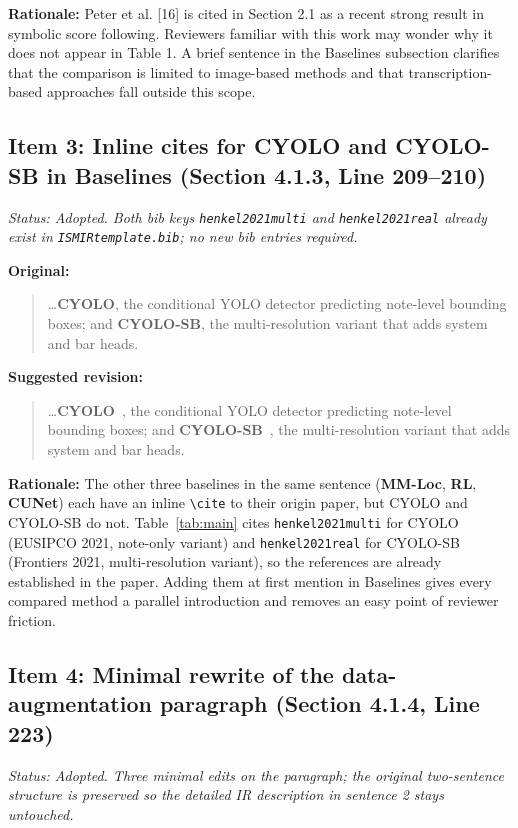 \documentclass{article}
\begin{document}
\textbf{Rationale:}
Peter et al. [16] is cited in Section 2.1 as a recent strong result in symbolic score following. Reviewers familiar with this work may wonder why it does not appear in Table 1. A brief sentence in the Baselines subsection clarifies that the comparison is limited to image-based methods and that transcription-based approaches fall outside this scope.

\subsection*{Item 3: Inline cites for CYOLO and CYOLO-SB in Baselines (Section 4.1.3, Line 209--210)}

\textit{Status: Adopted. Both bib keys \texttt{henkel2021multi} and \texttt{henkel2021real} already exist in \texttt{ISMIRtemplate.bib}; no new bib entries required.}

\textbf{Original:}
\begin{quote}
\ldots \textbf{CYOLO}, the conditional YOLO detector predicting note-level bounding boxes; and \textbf{CYOLO-SB}, the multi-resolution variant that adds system and bar heads.
\end{quote}

\textbf{Suggested revision:}
\begin{quote}
\ldots \textbf{CYOLO}~\cite{henkel2021multi}, the conditional YOLO detector predicting note-level bounding boxes; and \textbf{CYOLO-SB}~\cite{henkel2021real}, the multi-resolution variant that adds system and bar heads.
\end{quote}

\textbf{Rationale:}
The other three baselines in the same sentence (\textbf{MM-Loc}, \textbf{RL}, \textbf{CUNet}) each have an inline \texttt{\textbackslash cite} to their origin paper, but CYOLO and CYOLO-SB do not. Table~\ref{tab:main} cites \texttt{henkel2021multi} for CYOLO (EUSIPCO 2021, note-only variant) and \texttt{henkel2021real} for CYOLO-SB (Frontiers 2021, multi-resolution variant), so the references are already established in the paper. Adding them at first mention in Baselines gives every compared method a parallel introduction and removes an easy point of reviewer friction.

\subsection*{Item 4: Minimal rewrite of the data-augmentation paragraph (Section 4.1.4, Line 223)}

\textit{Status: Adopted. Three minimal edits on the paragraph; the original two-sentence structure is preserved so the detailed IR description in sentence 2 stays untouched.}
\end{document}

